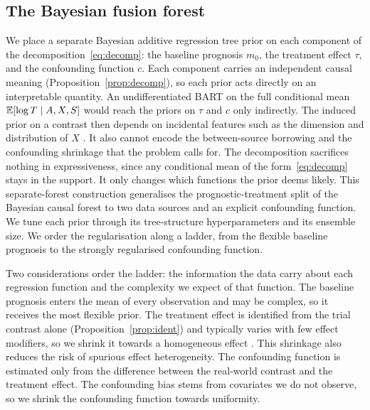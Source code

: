 \subsection{The Bayesian fusion forest}

We place a separate Bayesian additive regression tree prior on each component of the decomposition~\eqref{eq:decomp}: the baseline prognosis $m_0$, the treatment effect $\tau$, and the confounding function $c$.
Each component carries an independent causal meaning (Proposition~\ref{prop:decomp}), so each prior acts directly on an interpretable quantity.
An undifferentiated BART on the full conditional mean $\mathbb{E}[\log T \mid A, X, S]$ would reach the priors on $\tau$ and $c$ only indirectly.
The induced prior on a contrast then depends on incidental features such as the dimension and distribution of $X$ \citep{hahn2020bayesian}.
It also cannot encode the between-source borrowing and the confounding shrinkage that the problem calls for.
The decomposition sacrifices nothing in expressiveness, since any conditional mean of the form~\eqref{eq:decomp} stays in the support.
It only changes which functions the prior deems likely.
This separate-forest construction generalises the prognostic-treatment split of the Bayesian causal forest \citep{hahn2020bayesian} to two data sources and an explicit confounding function.
We tune each prior through its tree-structure hyperparameters and its ensemble size.
We order the regularisation along a ladder, from the flexible baseline prognosis to the strongly regularised confounding function.

Two considerations order the ladder: the information the data carry about each regression function and the complexity we expect of that function.
The baseline prognosis enters the mean of every observation and may be complex, so it receives the most flexible prior.
The treatment effect is identified from the trial contrast alone (Proposition~\ref{prop:ident}) and typically varies with few effect modifiers, so we shrink it towards a homogeneous effect \citep{hahn2020bayesian}.
This shrinkage also reduces the risk of spurious effect heterogeneity.
The confounding function is estimated only from the difference between the real-world contrast and the treatment effect.
The confounding bias stems from covariates we do not observe, so we shrink the confounding function towards uniformity.

